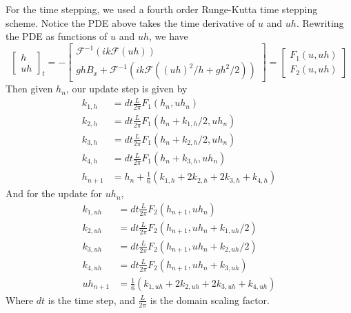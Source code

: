For the time stepping, we used a fourth order Runge-Kutta time stepping scheme. Notice the PDE above takes the time derivative of $u$ and $uh$. Rewriting the PDE as functions of $u$ and $uh$, we have
\[\begin{bmatrix}
    h\\
    uh
\end{bmatrix}_t = -\begin{bmatrix}
    \mathcal{F}^{-1}(ik\mathcal{F}(uh))\\
    ghB_x + \mathcal{F}^{-1}(ik\mathcal{F}((uh)^2/h + gh^2/2)) 
\end{bmatrix} = \begin{bmatrix}
    F_1(u,uh)\\
    F_2(u,uh)
\end{bmatrix}\]
Then given $h_n$, our update step is given by
\begin{align*}
    k_{1,h} &= dt\frac{L}{2\pi}F_1(h_n, uh_n)\\
    k_{2,h} &= dt\frac{L}{2\pi}F_1(h_n + k_{1,h}/2, uh_n)\\
    k_{3,h} &= dt\frac{L}{2\pi}F_1(h_n + k_{2,h}/2, uh_n)\\
    k_{4,h} &= dt\frac{L}{2\pi}F_1(h_n + k_{3,h}, uh_n)\\
    h_{n+1} &= h_n + \frac{1}{6}(k_{1,h} + 2k_{2,h} + 2k_{3,h} + k_{4,h})
\end{align*}
And for the update for $uh_n$,
\begin{align*}
    k_{1,uh} &= dt\frac{L}{2\pi}F_2(h_{n+1}, uh_n)\\
    k_{2,uh} &= dt\frac{L}{2\pi}F_2(h_{n+1}, uh_n + k_{1,uh}/2)\\
    k_{3,uh} &= dt\frac{L}{2\pi}F_2(h_{n+1}, uh_n + k_{2,uh}/2)\\
    k_{4,uh} &= dt\frac{L}{2\pi}F_2(h_{n+1}, uh_n + k_{3,uh})\\
    uh_{n+1} &= \frac{1}{6}(k_{1,uh} + 2k_{2,uh} + 2k_{3,uh} + k_{4,uh})
\end{align*}
Where $dt$ is the time step, and $\frac{L}{2\pi}$ is the domain scaling factor.